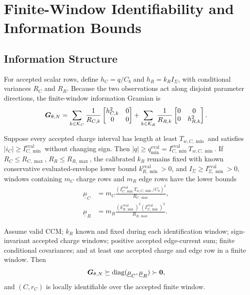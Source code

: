 \section{Finite-Window Identifiability and Information Bounds}
\label{sec:identifiability}

\subsection{Information Structure}

For accepted scalar rows, define $h_C=q/C_b$ and $h_R=k_RI_\Sigma$, with conditional variances $R_C$ and $R_R$. Because the two observations act along disjoint parameter directions, the finite-window information Gramian is
\begin{equation}
\bm{G}_{\theta,N}=
\sum_{k\in\mathcal K_C}\frac{1}{R_{C,k}}
\begin{bmatrix}h_{C,k}^2&0\\0&0\end{bmatrix}
+
\sum_{k\in\mathcal K_R}\frac{1}{R_{R,k}}
\begin{bmatrix}0&0\\0&h_{R,k}^2\end{bmatrix}.
\label{eq:gramian}
\end{equation}

Suppose every accepted charge interval has length at least $T_{w,C,\min}$ and satisfies $|i_C|\ge I_{C,\min}^{\mathrm{eval}}$ without changing sign. Then $|q|\ge q_{\min}^{\mathrm{eval}}=I_{C,\min}^{\mathrm{eval}}T_{w,C,\min}$. If $R_C\le R_{C,\max}$, $R_R\le R_{R,\max}$, the calibrated $k_R$ remains fixed with known conservative evaluated-envelope lower bound $k_{R,\min}^{\mathrm{eval}}>0$, and $I_\Sigma\ge I_{\Sigma,\min}^{\mathrm{eval}}>0$, windows containing $m_C$ charge rows and $m_R$ edge rows have the lower bounds
\begin{align}
\underline\mu_C & =m_C\frac{(I_{C,\min}^{\mathrm{eval}}T_{w,C,\min}/C_b)^2}{R_{C,\max}},
\label{eq:mu_c}\\
\underline\mu_R & =m_R\frac{(k_{R,\min}^{\mathrm{eval}})^2(I_{\Sigma,\min}^{\mathrm{eval}})^2}{R_{R,\max}}.
\label{eq:mu_r}
\end{align}

\begin{proposition}
\label{prop:identifiability}
Assume valid CCM; $k_R$ known and fixed during each identification window; sign-invariant accepted charge windows; positive accepted edge-current sum; finite conditional covariances; and at least one accepted charge and edge row in a finite window. Then
\begin{equation}
\bm{G}_{\theta,N}\succeq
\operatorname{diag}(\underline\mu_C,\underline\mu_R)\succ\bm{0},
\label{eq:positive_gramian}
\end{equation}
and $(C,r_C)$ is locally identifiable over the accepted finite window.
\end{proposition}

